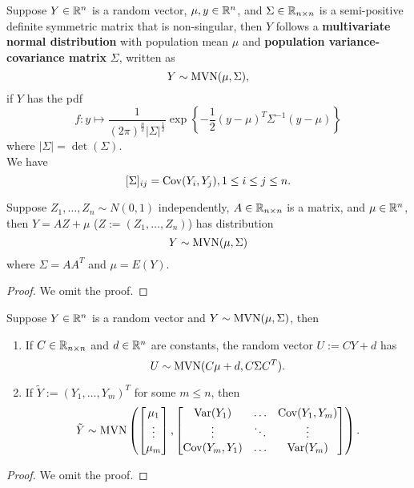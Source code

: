 \documentclass[11pt,fleqn]{book} %
\begin{document}
\begin{definition} \label{def:218}
Suppose \(Y \in \mathbb{R}^n\) is a random vector, \(\mu, y \in \mathbb{R}^n\), and \(\Sigma \in \mathbb{R}_{n\times n}\) is a semi-positive definite symmetric matrix that is non-singular, then \(Y\) follows a \textbf{multivariate normal distribution} with population mean \(\mu\) and \textbf{population variance-covariance matrix} \(\Sigma\), written as
\[
Y \sim \operatorname{MVN}(\mu, \Sigma),
\]
if \(Y\) has the pdf
\[
f: y\mapsto \frac{1}{(2\pi)^{\frac{n}{2}}|\Sigma|^{\frac12}}\exp\left\{-\frac12(y - \mu)^T\Sigma^{-1}(y - \mu)\right\}
\]
where \(|\Sigma| = \det(\Sigma)\). \\
\indent We have
\[
[\Sigma]_{ij} = \operatorname{Cov}(Y_i, Y_j), 1 \leq i \leq j \leq n.
\]
\end{definition}

\begin{proposition} \label{prop:219}
Suppose \(Z_1, \ldots, Z_n \sim N(0, 1)\) independently, \(A \in \mathbb{R}_{n\times n}\) is a matrix, and \(\mu\in\mathbb{R}^n\), then \(Y = AZ + \mu\) (\(Z := (Z_1, \ldots, Z_n)\)) has distribution
\[
Y \sim \operatorname{MVN}(\mu, \Sigma)
\]
where \(\Sigma = AA^T\) and \(\mu = E(Y)\).
\end{proposition}
\begin{proof} We omit the proof.\end{proof}

\begin{proposition} \label{prop:2110}
Suppose \(Y \in \mathbb{R}^n\) is a random vector and \(Y \sim \operatorname{MVN}(\mu, \Sigma)\), then
\begin{enumerate}
\item If \(C \in \mathbb{R}_{n\times n}\) and \(d \in \mathbb{R}^n\) are constants, the random vector \(U := CY + d\) has
\[
U \sim \operatorname{MVN}(C\mu + d, C\Sigma C^T).
\]
\item If \(\tilde{Y} := (Y_1, \ldots, Y_m)^T\) for some \(m \leq n\), then
\[
\tilde{Y} \sim \operatorname{MVN}\left(
\begin{bmatrix} 
\mu_1 \\ \vdots \\ \mu_m
\end{bmatrix},
\begin{bmatrix}
\operatorname{Var}(Y_1) & \ldots & \operatorname{Cov}(Y_1, Y_m) \\
\vdots & \ddots & \vdots \\
\operatorname{Cov}(Y_m, Y_1) & \ldots & \operatorname{Var}(Y_m)
\end{bmatrix}
\right).
\]
\end{enumerate}
\end{proposition}
\begin{proof} We omit the proof.\end{proof}
\end{document}
